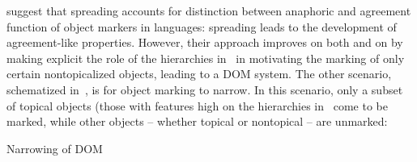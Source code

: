 \documentclass[output=paper]{LSP/langsci}
\begin{document}
\citet[215]{Dalrympleetal2011Objects} suggest that spreading accounts
for  distinction between anaphoric and
agreement function of object markers in  languages: spreading
leads to the development of agreement-like properties. However, their
approach improves on both \citet{Bresnanetal1987Topic} and on
\citet{Creissels2006Typology} by making explicit the role of the
hierarchies in~ in motivating the marking of
only certain nontopicalized objects, leading to a DOM system. The
other scenario, schematized in~, is for object marking to narrow. 
In this scenario, only a subset of topical objects
(those with features high on the  hierarchies
in~ come to be marked, while other objects –
whether topical or nontopical – are unmarked:

\begin{exe}
\ex
\label{02-do-ex:33}%
Narrowing of DOM \citet[218]{Dalrympleetal2011Objects}\\

\end{exe}
\end{document}
